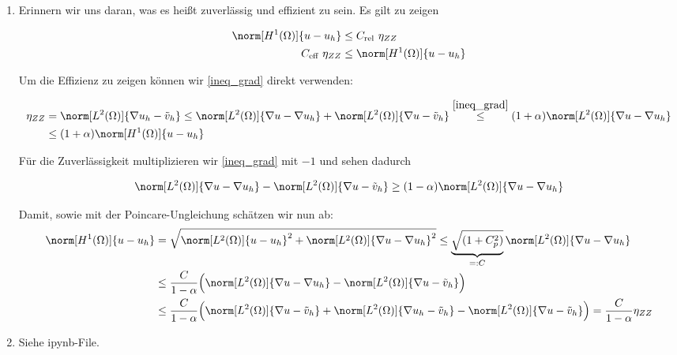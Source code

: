 
\begin{solution}

\begin{enumerate}[label = \textbf{\alph*)}]
  \item Erinnern wir uns daran, was es heißt zuverlässig und effizient zu sein. Es gilt zu zeigen

  \begin{align*}
    \norm[H^1(\Omega)]{u - u_h} &\leq C_{\text{rel}}~ \eta_{ZZ} \\
    C_{\text{eff}}~ \eta_{ZZ} &\leq \norm[H^1(\Omega)]{u - u_h}
  \end{align*}

  Um die Effizienz zu zeigen können wir \ref{ineq_grad} direkt verwenden:

  \begin{align*}
    \eta_{ZZ}
    &=
    \norm[L^2(\Omega)]{\nabla u_h - \tilde{v}_h}
    \leq
    \norm[L^2(\Omega)]{\nabla u - \nabla u_h} + \norm[L^2(\Omega)]{\nabla u - \tilde{v}_h}
    \stackrel{\ref{ineq_grad}}{\leq}
    (1 + \alpha) \norm[L^2(\Omega)]{\nabla u - \nabla u_h} \\
    &\leq
    (1 + \alpha) \norm[H^1(\Omega)]{u - u_h}
  \end{align*}

  Für die Zuverlässigkeit multiplizieren wir \ref{ineq_grad} mit $-1$ und sehen dadurch

  \begin{align*}
    \norm[L^2(\Omega)]{\nabla u - \nabla u_h} - \norm[L^2(\Omega)]{\nabla u - \tilde{v}_h}
    \geq
    (1 - \alpha) \norm[L^2(\Omega)]{\nabla u - \nabla u_h}
  \end{align*}

  Damit, sowie mit der Poincare-Ungleichung schätzen wir nun ab:
  \begin{align*}
    \norm[H^1(\Omega)]{u - u_h}
    &=
    \sqrt{\norm[L^2(\Omega)]{u - u_h}^2 + \norm[L^2(\Omega)]{\nabla u - \nabla u_h}^2}
    \leq
    \underbrace{\sqrt{(1+C_p^2)}}_{=:C} \norm[L^2(\Omega)]{\nabla u - \nabla u_h} \\
    &\leq
    \frac{C}{1-\alpha} \Big(
      \norm[L^2(\Omega)]{\nabla u - \nabla u_h} - \norm[L^2(\Omega)]{\nabla u - \tilde{v}_h}
    \Big) \\
    &\leq
    \frac{C}{1-\alpha} \Big(
      \norm[L^2(\Omega)]{\nabla u - \tilde{v}_h} + \norm[L^2(\Omega)]{\nabla u_h - \tilde{v}_h} - \norm[L^2(\Omega)]{\nabla u - \tilde{v}_h}
      \Big)
    =
    \frac{C}{1-\alpha} \eta_{ZZ}
  \end{align*}

  \item Siehe ipynb-File.
\end{enumerate}

\end{solution}

